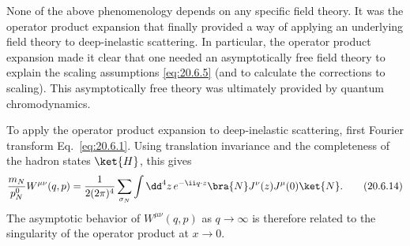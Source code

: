 None of the above phenomenology depends on any specific field theory. It was the operator product expansion that finally provided a way of applying an underlying field theory to deep-inelastic scattering. In particular, the operator product expansion made it clear that one needed an asymptotically free field theory to explain the scaling assumptions \eqref{eq:20.6.5} (and to calculate the corrections to scaling). This asymptotically free theory was ultimately provided by quantum chromodynamics.

To apply the operator product expansion to deep-inelastic scattering, first Fourier transform Eq.~\eqref{eq:20.6.1}. Using translation invariance and the completeness of the hadron states $\ket{H}$, this gives
\begin{equation}
\frac{m_N}{p_N^0}W^{\mu\nu}(q,p)
=\frac{1}{2(2\pi)^4}\sum_{\sigma_N}
\int \dd^4z\,e^{-\ii q\cdot z}
\bra{N}J^\nu(z)J^\mu(0)\ket{N}.
\tag{20.6.14}\label{eq:20.6.14}
\end{equation}
The asymptotic behavior of $W^{\mu\nu}(q,p)$ as $q\to\infty$ is therefore related to the singularity of the operator product at $x\to0$.

